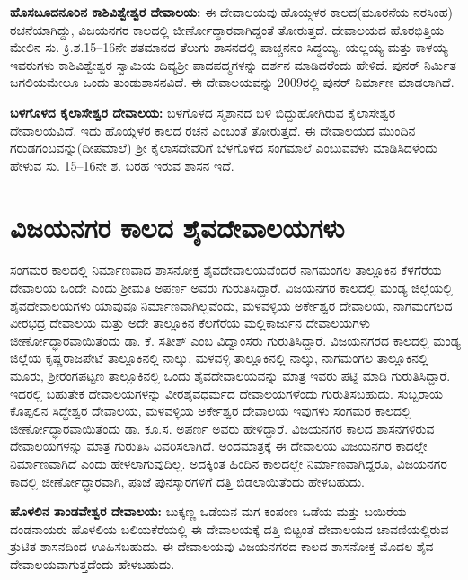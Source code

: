 \textbf{ಹೊಸಬೂದನೂರಿನ ಕಾಶಿವಿಶ್ವೇಶ್ವರ ದೇವಾಲಯ:} ಈ ದೇವಾಲಯವು ಹೊಯ್ಸಳರ ಕಾಲದ(ಮೂರನೆಯ ನರಸಿಂಹ) ರಚನೆಯಾಗಿದ್ದು, ವಿಜಯನಗರ ಕಾಲದಲ್ಲಿ ಜೀರ್ಣೋದ್ಧಾರವಾಗಿದ್ದಂತೆ ತೋರುತ್ತದೆ. ದೇವಾಲಯದ ಹೊರಭಿತ್ತಿಯ ಮೇಲಿನ ಸು. ಕ್ರಿ.ಶ.15–16ನೇ ಶತಮಾನದ ತೆಲುಗು ಶಾಸನದಲ್ಲಿ ಪಾಚ್ಚನನಂ ಸಿದ್ಧಯ್ಯ, ಯಲ್ಲಯ್ಯ ಮತ್ತು ಕಾಳಯ್ಯ ಇವರುಗಳು ಕಾಶಿವಿಶ್ವೇಶ್ವರ ಸ್ವಾಮಿಯ ದಿವ್ಯಶ‍್ರೀ ಪಾದಪದ್ಮಗಳನ್ನು ದರ್ಶನ ಮಾಡಿದರೆಂದು ಹೇಳಿದೆ. ಪುನರ್​ ನಿರ್ಮಿತ ಜಗಲಿಯಮೇಲೂ ಒಂದು ತುಂಡುಶಾಸನವಿದೆ. ಈ ದೇವಾಲಯವನ್ನು 2009ರಲ್ಲಿ ಪುನರ್​ ನಿರ್ಮಾಣ ಮಾಡಲಾಗಿದೆ. 

\textbf{ಬಳಗೊಳದ ಕೈಲಾಸೇಶ್ವರ ದೇವಾಲಯ:} ಬಳಗೊಳದ ಸ್ಮಶಾನದ ಬಳಿ ಬಿದ್ದುಹೋಗಿರುವ ಕೈಲಾಸೇಶ್ವರ ದೇವಾಲಯವಿದೆ. ಇದು ಹೊಯ್ಸಳರ ಕಾಲದ ರಚನೆ ಎಂಬಂತೆ ತೋರುತ್ತದೆ. ಈ ದೇವಾಲಯದ ಮುಂದಿನ ಗರುಡಗಂಬವನ್ನು(ದೀಪಮಾಲೆ) ಶ‍್ರೀ ಕೈಲಾಸದೇವರಿಗೆ ಬೆಳಗೊಳದ ಸಂಗಮಾಲೆ ಎಂಬುವವಳು ಮಾಡಿಸಿದಳೆಂದು ಹೇಳುವ ಸು. 15–16ನೇ ಶ. ಬರಹ ಇರುವ ಶಾಸನ ಇದೆ. 


\section{ವಿಜಯನಗರ ಕಾಲದ ಶೈವದೇವಾಲಯಗಳು}

ಸಂಗಮರ ಕಾಲದಲ್ಲಿ ನಿರ್ಮಾಣವಾದ ಶಾಸನೋಕ್ತ ಶೈವದೇವಾಲಯವೆಂದರೆ ನಾಗಮಂಗಲ ತಾಲ್ಲೂಕಿನ ಕೆಳಗೆರೆಯ ದೇವಾಲಯ ಒಂದೇ ಎಂದು ಶ‍್ರೀಮತಿ ಅಪರ್ಣ ಅವರು ಗುರುತಿಸಿದ್ದಾರೆ. ವಿಜಯನಗರ ಕಾಲದಲ್ಲಿ ಮಂಡ್ಯ ಜಿಲ್ಲೆಯಲ್ಲಿ ಶೈವದೇವಾಲಯಗಳು ಯಾವುವೂ ನಿರ್ಮಾಣವಾಗಿಲ್ಲವೆಂದು, ಮಳವಳ್ಳಿಯ ಅರ್ಕೇಶ್ವರ ದೇವಾಲಯ, ನಾಗಮಂಗಲದ ವೀರಭದ್ರ ದೇವಾಲಯ ಮತ್ತು ಅದೇ ತಾಲ್ಲೂಕಿನ ಕೆಲಗೆರೆಯ ಮಲ್ಲಿಕಾರ್ಜುನ ದೇವಾಲಯಗಳು ಜೀರ್ಣೋದ್ಧಾರವಾಯಿತೆಂದು ಡಾ. ಕೆ. ಸತೀಶ್​ ಎಂಬ ವಿದ್ವಾಂಸರು ಗುರುತಿಸಿದ್ದಾರೆ. ವಿಜಯನಗರದ ಕಾಲದಲ್ಲಿ ಮಂಡ್ಯ ಜಿಲ್ಲೆಯ ಕೃಷ್ಣರಾಜಪೇಟೆ ತಾಲ್ಲೂಕಿನಲ್ಲಿ ನಾಲ್ಕು, ಮಳವಳ್ಳಿ ತಾಲ್ಲೂಕಿನಲ್ಲಿ ನಾಲ್ಕು, ನಾಗಮಂಗಲ ತಾಲ್ಲೂಕಿನಲ್ಲಿ ಮೂರು, ಶ‍್ರೀರಂಗಪಟ್ಟಣ ತಾಲ್ಲೂಕಿನಲ್ಲಿ ಒಂದು ಶೈವದೇವಾಲಯವನ್ನು ಮಾತ್ರ ಇವರು ಪಟ್ಟಿ ಮಾಡಿ ಗುರುತಿಸಿದ್ದಾರೆ. ಇದರಲ್ಲಿ ಬಹುತೇಕ ದೇವಾಲಯಗಳನ್ನು ವೀರಶೈವಧರ್ಮದ ದೇವಾಲಯಗಳೆಂದು ಗುರುತಿಸಬಹುದು. ಸುಬ್ಬರಾಯ ಕೊಪ್ಪಲಿನ ಸಿದ್ಧೇಶ್ವರ ದೇವಾಲಯ, ಮಳವಳ್ಳಿಯ ಅರ್ಕೇಶ್ವರ ದೇವಾಲಯ ಇವುಗಳು ಸಂಗಮರ ಕಾಲದಲ್ಲಿ ಜೀರ್ಣೋದ್ಧಾರವಾಯಿತೆಂದು ಡಾ. ಕೂ.ಸ. ಅಪರ್ಣ ಅವರು ಹೇಳಿದ್ದಾರೆ. ವಿಜಯನಗರ ಕಾಲದ ಶಾಸನಗಳಿರುವ ದೇವಾಲಯಗಳನ್ನು ಮಾತ್ರ ಗುರುತಿಸಿ ವಿವರಿಸಲಾಗಿದೆ. ಅಂದಮಾತ್ರಕ್ಕೆ ಈ ದೇವಾಲಯ ವಿಜಯನಗರ ಕಾದಲ್ಲೇ ನಿರ್ಮಾಣವಾಗಿದೆ ಎಂದು ಹೇಳಲಾಗುವುದಿಲ್ಲ. ಅದಕ್ಕಿಂತ ಹಿಂದಿನ ಕಾಲದಲ್ಲೇ ನಿರ್ಮಾಣವಾಗಿದ್ದರೂ, ವಿಜಯನಗರ ಕಾದಲ್ಲಿ ಜೀರ್ಣೋದ್ಧಾರವಾಗಿ, ಪೂಜೆ ಪುನಸ್ಕಾರಗಳಿಗೆ ದತ್ತಿ ಬಿಡಲಾಯಿತೆಂದು ಹೇಳಬಹುದು.

\textbf{ಹೊಳಲಿನ ತಾಂಡವೇಶ್ವರ ದೇವಾಲಯ: } ಬುಕ್ಕಣ್ಣ ಒಡೆಯನ ಮಗ ಕಂಪಂಣ ಒಡೆಯ ಮತ್ತು ಬಯಿರೆಯ ದಂಡನಾಯರು ಹೊಳಲಿಯ ಬಲಿಯಕೆರೆಯಲ್ಲಿ ಈ ದೇವಾಲಯಕ್ಕೆ ದತ್ತಿ ಬಿಟ್ಟಂತೆ ದೇವಾಲಯದ ಚಾವಣಿಯಲ್ಲಿರುವ ತ್ರುಟಿತ ಶಾಸನದಿಂದ ಊಹಿಸಬಹುದು. ಈ ದೇವಾಲಯವು ವಿಜಯನಗರದ ಕಾಲದ ಶಾಸನೋಕ್ತ ಮೊದಲ ಶೈವ ದೇವಾಲಯವಾಗುತ್ತದೆಂದು ಹೇಳಬಹುದು.

